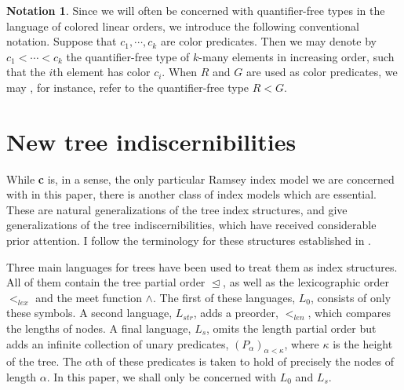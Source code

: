 \documentclass{article}
\theoremstyle{definition}
\theoremstyle{definition}
\theoremstyle{definition}
\newtheorem{notation}{Notation}
\theoremstyle{definition}
\begin{document}
\begin{notation}
    Since we will often be concerned with quantifier-free types in the language of colored linear orders, we introduce the following conventional notation. Suppose that $c_1,\dotsm, c_k$  are color predicates. Then we may denote by $c_1<\dotsm <c_k$  the quantifier-free type of $k$-many elements in increasing order, such that the $i$th element has color $c_i$. When $R$ and $G$ are used as color predicates, we may , for instance, refer to the quantifier-free type $R<G$.
\end{notation}




\section{New tree indiscernibilities}\label{tree indiscernibles section}
While \textbf{c} is, in a sense, the only particular Ramsey index model we are concerned with in this paper, there is another class of index models which are essential. These are natural generalizations of the tree index structures, and give generalizations of the tree indiscernibilities, which have received considerable prior attention. I follow the terminology for these structures established in \cite{Kim_Kim_Scow_2013}.

Three main languages for trees have been used to treat them as index structures. All of them contain the tree partial order $\trianglelefteq$, as well as the lexicographic order $<_{lex}$ and the meet function $\land$. The first of these languages, $L_0$, consists of only these symbols. A second language, $L_{str}$, adds a  preorder, $<_{len}$, which compares the lengths of nodes. A final language, $L_s$, omits the length partial order but adds an infinite collection of unary predicates, $(P_\alpha)_{\alpha<\kappa}$, where $\kappa$ is the height of the tree. The $\alpha$th of these predicates is taken to hold of precisely the nodes of length $\alpha$. In this paper, we shall only be concerned with $L_0$ and $L_s$.
\end{document}
